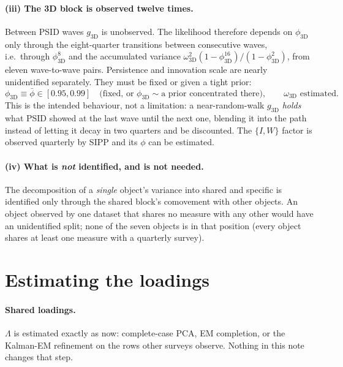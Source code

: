 \documentclass[11pt]{article}
\begin{document}
\paragraph{(iii) The 3D block is observed twelve times.} Between PSID waves
$g_{\mathrm{3D}}$ is unobserved. The likelihood therefore depends on
$\phi_{\mathrm{3D}}$ only through the eight-quarter transitions between
consecutive waves, i.e.\ through $\phi_{\mathrm{3D}}^{8}$ and the accumulated
variance $\omega_{\mathrm{3D}}^2(1-\phi^{16}_{\mathrm{3D}})/(1-\phi^2_{\mathrm{3D}})$,
from eleven wave-to-wave pairs. Persistence and innovation scale are nearly
unidentified separately. They must be fixed or given a tight prior:
\begin{equation}
  \phi_{\mathrm{3D}} \equiv \bar\phi \in [0.95, 0.99]
  \quad\text{(fixed, or } \phi_{\mathrm{3D}} \sim \text{a prior concentrated there)},
  \qquad \omega_{\mathrm{3D}} \text{ estimated}.
\end{equation}
This is the intended behaviour, not a limitation: a near-random-walk
$g_{\mathrm{3D}}$ \emph{holds} what PSID showed at the last wave until the next
one, blending it into the path instead of letting it decay in two quarters and
be discounted. The $\{I,W\}$ factor is observed quarterly by SIPP and its
$\phi$ can be estimated.

\paragraph{(iv) What is \emph{not} identified, and is not needed.} The
decomposition of a \emph{single} object's variance into shared and specific is
identified only through the shared block's comovement with other objects. An
object observed by one dataset that shares no measure with any other would have
an unidentified split; none of the seven objects is in that position (every
object shares at least one measure with a quarterly survey).

\section{Estimating the loadings}\label{sec:loadings}

\paragraph{Shared loadings.} $\Lambda$ is estimated exactly as now: complete-case
PCA, EM completion, or the Kalman-EM refinement on the rows other surveys
observe. Nothing in this note changes that step.
\end{document}
